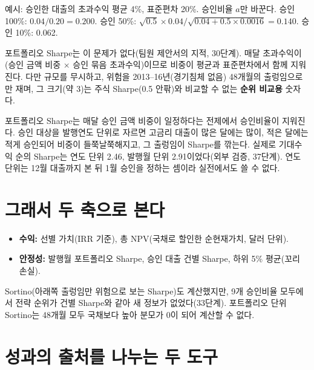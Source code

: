 \begin{workout}
 예시: 승인한 대출의 초과수익 평균 4\%, 표준편차 20\%. 승인비율 $a$만 바꾼다.
 승인 100\%: $0.04/0.20=0.200$.
 승인 50\%: $\sqrt{0.5}\times0.04/\sqrt{0.04+0.5\times0.0016}=0.140$.
 승인 10\%: 0.062.
\end{workout}

포트폴리오 Sharpe는 이 문제가 없다(팀원 제안서의 지적, 30단계). 매달 초과수익이 (승인 금액 비중 \ensuremath{\times} 승인 묶음 초과수익)이므로 비중이 평균과 표준편차에서 함께 지워진다. 다만 규모를 무시하고, 위험을 2013--16년(경기침체 없음) 48개월의 출렁임으로만 재며, 그 크기(약 3)는 주식 Sharpe(0.5 안팎)와 비교할 수 없는 \textbf{순위 비교용} 숫자다.

\begin{warnbox}
포트폴리오 Sharpe는 매달 승인 금액 비중이 일정하다는 전제에서 승인비율이 지워진다. 승인 대상을 발행연도 단위로 자르면 고금리 대출이 많은 달에는 많이, 적은 달에는 적게 승인되어 비중이 들쭉날쭉해지고, 그 출렁임이 Sharpe를 깎는다. 실제로 기대수익 순의 Sharpe는 연도 단위 2.46, 발행월 단위 2.91이었다(외부 검증, 37단계). 연도 단위는 12월 대출까지 본 뒤 1월 승인을 정하는 셈이라 실전에서도 쓸 수 없다.
\end{warnbox}

\section{그래서 두 축으로 본다}
\begin{keybox}[수익 축과 안정성 축]
\begin{itemize}[leftmargin=*]
\item \textbf{수익:} 선별 가치(IRR 기준), 총 NPV(국채로 할인한 순현재가치, 달러 단위).
\item \textbf{안정성:} 발행월 포트폴리오 Sharpe, 승인 대출 건별 Sharpe, 하위 5\% 평균(꼬리 손실).
\end{itemize}
Sortino(아래쪽 출렁임만 위험으로 보는 Sharpe)도 계산했지만, 9개 승인비율 모두에서 전략 순위가 건별 Sharpe와 같아 새 정보가 없었다(33단계). 포트폴리오 단위 Sortino는 48개월 모두 국채보다 높아 분모가 0이 되어 계산할 수 없다.
\end{keybox}

\section{성과의 출처를 나누는 두 도구}
